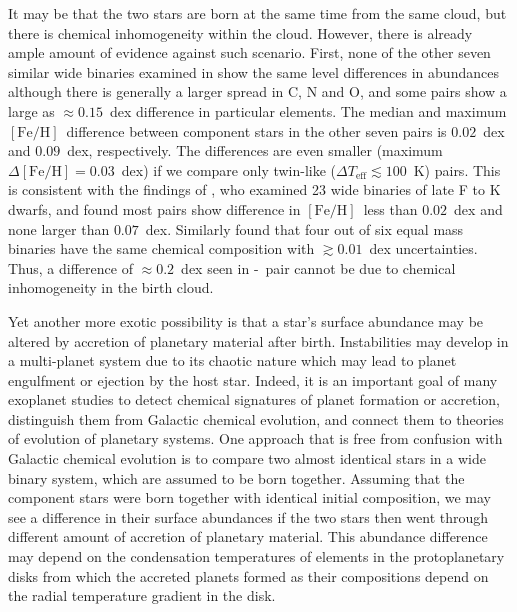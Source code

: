 \documentclass[modern, letterpaper]{aastex61}
\newcommand*\elem[1]{\ensuremath{\mathrm{#1}}}
\newcommand*\elemH[1]{\ensuremath{[\mathrm{#1}/\elem{H}]}}
\newcommand*{\feh}{\ensuremath{\elemH{Fe}}}
\newcommand{\sunanalog}{\text{Krios}}
\newcommand{\bizarreone}{\text{Kronos}}
\begin{document}
It may be that the two stars are born at the same time from the same cloud, but
there is chemical inhomogeneity within the cloud.
However, there is already ample amount of evidence against such scenario.
First, none of the other seven similar wide binaries examined in
\citealt{2016ApJS..225...32B} show the same level differences in abundances
although there is generally a larger spread in $\elem{C}$, $\elem{N}$ and
$\elem{O}$, and some pairs show a large as $\approx 0.15$~dex difference in
particular elements.
The median and maximum \feh\ difference between component stars in the other
seven pairs is $0.02$~dex and $0.09$~dex, respectively.
The differences are even smaller (maximum $\Delta\feh = 0.03$~dex)
if we compare only twin-like ($\Delta T_\mathrm{eff} \lesssim 100$~K) pairs.
This is consistent with the findings of \citealt{Desidera:2004aa}, who examined
23 wide binaries of late F to K dwarfs, and found most pairs show difference in
\feh\ less than $0.02$~dex and none larger than $0.07$~dex.
Similarly \citealt{Gratton:2001aa} found that four out of six equal mass binaries
have the same chemical composition with $\gtrsim 0.01$~dex uncertainties.
Thus, a difference of $\approx 0.2$~dex seen in \bizarreone-\sunanalog\ pair
cannot be due to chemical inhomogeneity in the birth cloud.

Yet another more exotic possibility is that a star's surface abundance may
be altered by accretion of planetary material after birth.
Instabilities may develop in a multi-planet system due to its chaotic nature
which may lead to planet engulfment or ejection by the host star.
Indeed, it is an important goal of many exoplanet studies
to detect chemical signatures of planet formation or accretion,
distinguish them from Galactic chemical evolution, and
connect them to theories of evolution of planetary systems.
One approach that is free from confusion with Galactic chemical evolution
is to compare two almost identical stars in a wide binary system,
which are assumed to be born together.
Assuming that the component stars were born together with identical
initial composition, we may see a difference in their surface abundances
if the two stars then went through different amount of accretion
of planetary material.
This abundance difference may depend on the condensation temperatures of
elements in the protoplanetary disks from which the accreted planets formed
as their compositions depend on the radial temperature gradient in the disk.
\end{document}
